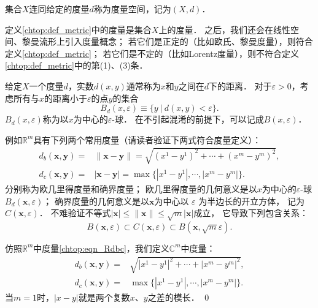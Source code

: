 \begin{definition}
    集合$X$连同给定的度量$d$称为{\heiti 度量空间}，记为$(X,d)$．
\end{definition}

定义\ref{chtop:def_metric}中的度量是集合$X$上的度量．
之后，我们还会在线性空间、黎曼流形上引入度量概念；
若它们是正定的（比如欧氏、黎曼度量），则符合定义\ref{chtop:def_metric}；
若它们是不定的（比如Lorentz度量），则不符合定义\ref{chtop:def_metric}中的第(1)、(3)条．



给定$X$一个度量$d$，实数$d(x,y)$通常称为$x$和$y$之间在$d$下的{\heiti 距离}．
对于$\varepsilon >0$，考虑所有与$x$的距离小于$\varepsilon$的点$y$的集合
\begin{equation}\label{chtop:eqn_eball}
    B_{d}(x,\varepsilon)\equiv \{y \ |\ d(x,y)<\varepsilon\} .
\end{equation}
$B_{d}(x,\varepsilon)$称为{\heiti 以$x$为中心的$\varepsilon$-球}．
在不引起混淆的前提下，可以记成$B(x,\varepsilon)$．

例如$\mathbb{R}^m$具有下列两个常用度量（请读者验证下两式符合度量定义）：
\begin{subequations}\label{chtop:eqn_Rdbc}
    \begin{align}
        d_b(\boldsymbol{x}, \boldsymbol{y})=& \|\boldsymbol{x}-\boldsymbol{y}\|
        =\sqrt{(x^1-y^1)^2+\cdots +(x^m-y^m)^2}, \label{chtop:eqn_Rdb} \\
        d_c(\boldsymbol{x}, \boldsymbol{y})=& |\boldsymbol{x}-\boldsymbol{y}|
        =\max\{|x^1-y^1|,\cdots,|x^m-y^m| \}. \label{chtop:eqn_Rdc}
    \end{align}
\end{subequations}
分别称为欧几里得度量和确界度量；
欧几里得度量的几何意义是以$x$为中心的$\varepsilon$-球$B_{d}(\boldsymbol{x},\varepsilon)$；
确界度量的几何意义是以$\boldsymbol{x}$为中心以 $\varepsilon$ 为半边长的开立方体，
记为$C(\boldsymbol{x} , \varepsilon)$．
不难验证不等式$|\boldsymbol{x}| \leqslant\|\boldsymbol{x}\| \leqslant \sqrt{m}|\boldsymbol{x}|$成立，
它导致下列包含关系：
\begin{equation}\label{chtop:eqn_BCB}
    B(\boldsymbol{x} , \varepsilon) \subset C(\boldsymbol{x} , \varepsilon)
     \subset B(\boldsymbol{x} , \sqrt{m} \varepsilon) .
\end{equation}


\begin{example}
仿照$\mathbb{R}^m$中度量\eqref{chtop:eqn_Rdbc}，我们定义$\mathbb{C}^m$中度量：
\begin{subequations}\label{chtop:eqn_Rdbc-cx}
	\begin{align}
		d_b(\boldsymbol{x}, \boldsymbol{y})=& 
		\sqrt{|x^1-y^1|^2+\cdots +|x^m-y^m|^2}, \label{chtop:eqn_Rdbhs} \\
		d_c(\boldsymbol{x}, \boldsymbol{y})=& 
		\max\{|x^1-y^1|,\cdots,|x^m-y^m| \}. \label{chtop:eqn_Rdchs}
	\end{align}
\end{subequations}
当$m=1$时，$|x-y|$就是两个复数$x$、$y$之差的模长． \qed
\end{example}


